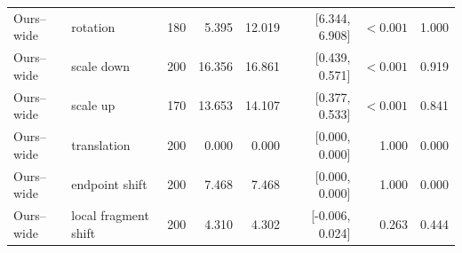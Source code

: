 \begin{table}[t]
{\begin{tabular}{llrrrrrr}
Ours--wide & rotation & 180 & 5.395 & 12.019 & [6.344, 6.908] & \(<0.001\) & 1.000 \\
Ours--wide & scale down & 200 & 16.356 & 16.861 & [0.439, 0.571] & \(<0.001\) & 0.919 \\
Ours--wide & scale up & 170 & 13.653 & 14.107 & [0.377, 0.533] & \(<0.001\) & 0.841 \\
Ours--wide & translation & 200 & 0.000 & 0.000 & [0.000, 0.000] & 1.000 & 0.000 \\
Ours--wide & endpoint shift & 200 & 7.468 & 7.468 & [0.000, 0.000] & 1.000 & 0.000 \\
Ours--wide & local fragment shift & 200 & 4.310 & 4.302 & [-0.006, 0.024] & 0.263 & 0.444 \\
\bottomrule
\end{tabular}%
}
\end{table}
